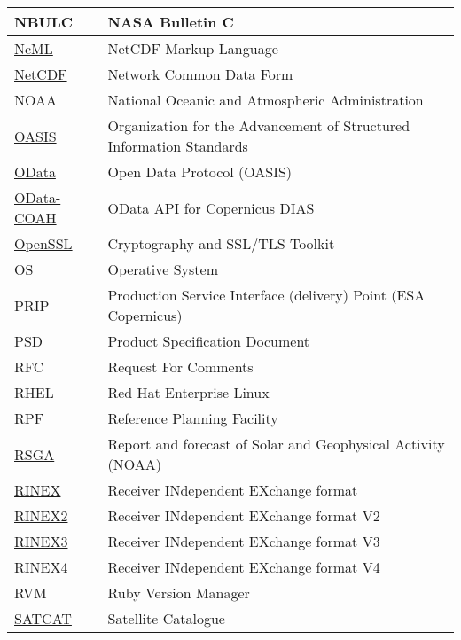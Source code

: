 \documentclass[dec_sum_main.tex]{subfiles}
\begin{document}
\begin{longtable}{|m{2.8cm}|m{10cm}|}
    NBULC & NASA Bulletin C \\ \hline
    \href{https://www.unidata.ucar.edu/software/netcdf-java/v4.6/ncml/index.htm}{NcML} & NetCDF Markup Language \\ \hline
    \href{https://www.unidata.ucar.edu/software/netcdf/}{NetCDF} & Network Common Data Form \\ \hline
	NOAA & National Oceanic and Atmospheric Administration \\ \hline
	\href{https://www.oasis-open.org/}{OASIS} & Organization for the Advancement of Structured Information Standards \\ \hline
	\href{https://www.odata.org/documentation/}{OData} & Open Data Protocol (OASIS) \\ \hline
    \href{https://scihub.copernicus.eu/twiki/do/view/SciHubUserGuide/ODataAPI?redirectedfrom=SciHubUserGuide.7ODataAPI}{OData-COAH} & OData API for Copernicus DIAS \\ \hline
    \href{https://wiki.openssl.org/index.php/Main_Page}{OpenSSL} & Cryptography and SSL/TLS Toolkit \\ \hline    
	OS & Operative System \\ \hline
	PRIP & Production Service Interface (delivery) Point (ESA Copernicus) \\ \hline
    PSD & Product Specification Document \\ \hline
	RFC & Request For Comments \\ \hline
	RHEL & Red Hat Enterprise Linux \\ \hline
    RPF & Reference Planning Facility \\ \hline
	\href{https://www.swpc.noaa.gov/products/solar-and-geophysical-activity-summary}{RSGA} & Report and forecast of Solar and Geophysical Activity  (NOAA)\\ \hline
	\href{https://www.igs.org/wg/rinex/#documents-formats}{RINEX} & Receiver INdependent EXchange format \\ \hline
	\href{https://files.igs.org/pub/data/format/rinex211.txt}{RINEX2} & Receiver INdependent EXchange format V2 \\ \hline
	\href{https://files.igs.org/pub/data/format/rinex305.pdf}{RINEX3} & Receiver INdependent EXchange format V3 \\ \hline
	\href{https://files.igs.org/pub/data/format/rinex_4.00.pdf}{RINEX4} & Receiver INdependent EXchange format V4 \\ \hline	
	RVM & Ruby Version Manager \\ \hline
    \href{https://celestrak.com/satcat/search.php}{SATCAT} & Satellite Catalogue \\ \hline

\end{longtable}
\end{document}
